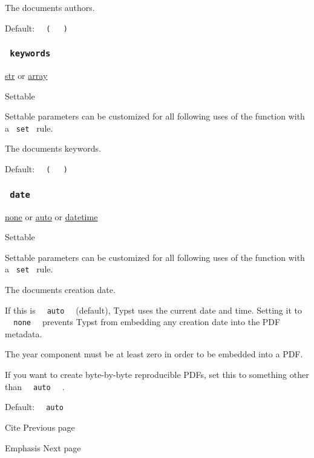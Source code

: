 The document\textquotesingle s authors.

Default:
\texttt{\ }{\texttt{\ (\ }}\texttt{\ }{\texttt{\ )\ }}\texttt{\ }

\subsubsection{\texorpdfstring{\texttt{\ keywords\ }}{ keywords }}\label{parameters-keywords}

\href{/docs/reference/foundations/str/}{str} {or}
\href{/docs/reference/foundations/array/}{array}

{{ Settable }}

\label{parameters-keywords-settable-tooltip}
Settable parameters can be customized for all following uses of the
function with a \texttt{\ set\ } rule.

The document\textquotesingle s keywords.

Default:
\texttt{\ }{\texttt{\ (\ }}\texttt{\ }{\texttt{\ )\ }}\texttt{\ }

\subsubsection{\texorpdfstring{\texttt{\ date\ }}{ date }}\label{parameters-date}

\href{/docs/reference/foundations/none/}{none} {or}
\href{/docs/reference/foundations/auto/}{auto} {or}
\href{/docs/reference/foundations/datetime/}{datetime}

{{ Settable }}

\label{parameters-date-settable-tooltip}
Settable parameters can be customized for all following uses of the
function with a \texttt{\ set\ } rule.

The document\textquotesingle s creation date.

If this is \texttt{\ }{\texttt{\ auto\ }}\texttt{\ } (default), Typst
uses the current date and time. Setting it to
\texttt{\ }{\texttt{\ none\ }}\texttt{\ } prevents Typst from embedding
any creation date into the PDF metadata.

The year component must be at least zero in order to be embedded into a
PDF.

If you want to create byte-by-byte reproducible PDFs, set this to
something other than \texttt{\ }{\texttt{\ auto\ }}\texttt{\ } .

Default: \texttt{\ }{\texttt{\ auto\ }}\texttt{\ }

\href{/docs/reference/model/cite/}{\pandocbounded{}}

{ Cite } { Previous page }

\href{/docs/reference/model/emph/}{\pandocbounded{}}

{ Emphasis } { Next page }
